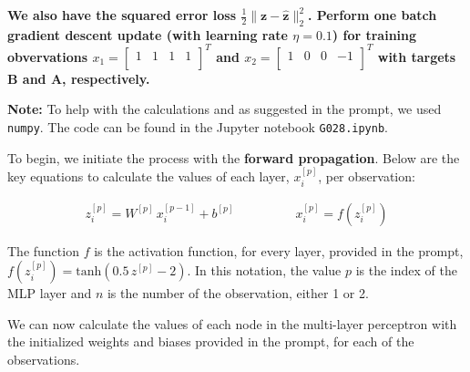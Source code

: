 \documentclass[12pt]{article}
\begin{document}
\begin{enumerate}[leftmargin=\labelsep]
          \vskip -0.5cm
          \textbf{We also have the squared error loss $\frac{1}{2} \|\mathbf{z} - \hat{\mathbf{z}}\|^{2}_{2}$. Perform one batch gradient descent update (with learning rate $\eta = 0.1$) for training
          obvervations $x_1 = \begin{bmatrix} 1 & 1 & 1 & 1 \\ \end{bmatrix}^T$ and $x_2 = \begin{bmatrix} 1 & 0 & 0 & -1 \\ \end{bmatrix}^T$ with targets B and A,
          respectively.}

          \vskip 0.3cm
          \textbf{Note:} To help with the calculations and as suggested in the prompt, we used \texttt{numpy}.
          The code can be found in the Jupyter notebook \texttt{G028.ipynb}.

          To begin, we initiate the process with the \textbf{forward propagation}. Below are the key equations to calculate the values of each
          layer, $x^{[p]}_i$, per observation:

          \vskip -0.2cm
          \begin{align*}
              z^{[p]}_i = W^{[p]} \, x^{[p-1]}_i + b^{[p]} & \qquad\qquad
              x^{[p]}_i = f\left(z^{[p]}_i\right)
          \end{align*}

          The function $f$ is the activation function, for every layer, provided in the prompt, $f\left(z^{[p]}_i\right) = \text{tanh}\left(0.5\,z^{[p]} - 2\right)$.
          In this notation, the value $p$ is the index of the MLP layer and $n$ is the number of the observation, either 1 or 2.

          We can now calculate the values of each node in the multi-layer perceptron with the initialized weights and biases provided in the prompt,
          for each of the observations.


\end{enumerate}
\end{document}

